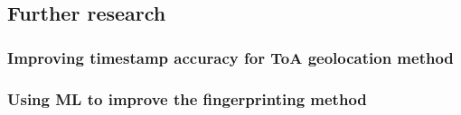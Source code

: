 \subsection{Further research}

\subsubsection{Improving timestamp accuracy for \acf{ToA} geolocation method}


\subsubsection{Using \acf{ML} to improve the fingerprinting method}